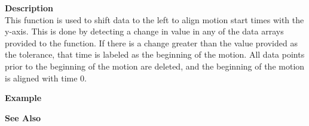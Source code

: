 \noindent
{\bf Description}\\
This function is used to shift data to the left to align motion start times with the
y-axis. This is done by detecting a change in value in any of the data arrays provided
to the function. If there is a change greater than the value provided as the
tolerance, that time is labeled as the beginning of the motion. All data points
prior to the beginning of the motion are deleted, and the beginning of the
motion is aligned with time 0.

\noindent
{\bf Example}\\
\noindent

\noindent
{\bf See Also}\\

